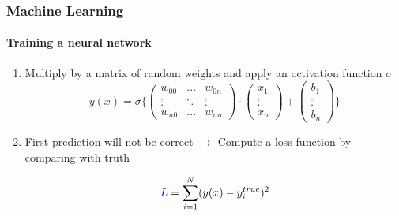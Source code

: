 \documentclass[aspectratio=43]{beamer}
\begin{document}
\begin{frame}
	
	\frametitle{Machine Learning}
	\framesubtitle{Training a neural network}
	
	\begin{enumerate}
		
		\item Multiply by a matrix of random weights and apply an activation function $\sigma$
		\begin{equation}
			y(x) = \sigma \Bigg\{ \begin{pmatrix}
			w_{00} & ... & w_{0n} \\
			\vdots & \ddots & \vdots \\
			w_{n0} & ... & w_{nn}
			\end{pmatrix} \cdot \left( \begin{array}{c} x_{1} \\ \vdots \\ x_{n} \end{array} \right)
			+ \left( \begin{array}{c} b_{1} \\ \vdots \\ b_{n} \end{array} \right) \Bigg\}
			\nonumber
		\end{equation}
		
		\item First prediction will not be correct $\longrightarrow$ Compute a {\color{blue}loss} function by comparing with truth 
		
		\begin{equation}
			{\color{blue}L} = \sum_{i = 1}^{N} (y(x) - y_{i}^{true})^{2}
			\nonumber
		\end{equation}
		
	\end{enumerate}

\end{frame}
\end{document}
